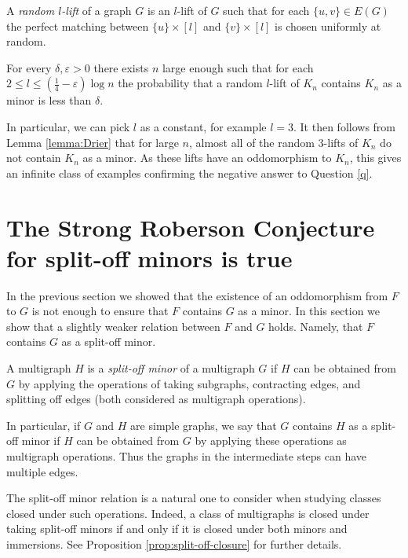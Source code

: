 \documentclass[11pt]{article}
\begin{document}
A \emph{random $l$-lift} of a graph $G$ is an $l$-lift of $G$ such that for each $\{u,v\} \in E(G)$ the perfect matching between $\{u\} \times [l]$ and $\{v\} \times [l]$ is chosen uniformly at random.

\begin{lemma}
\label{lemma:Drier}
    For every $\delta,\varepsilon>0$ there exists $n$ large enough such that for each $2\leq l \leq (\frac14 - \varepsilon) \log n$ the probability that a random $l$-lift of $K_n$ contains $K_n$ as a minor is less than $\delta$.
\end{lemma}

In particular, we can pick $l$ as a constant, for example $l =3$. It then follows from Lemma \ref{lemma:Drier} that for large $n$, almost all of the random $3$-lifts of $K_n$ do not contain $K_n$ as a minor. 
As these lifts have an oddomorphism to $K_n$, this gives an infinite class of examples confirming the negative answer to Question \ref{q}.



\section{The Strong Roberson Conjecture for split-off minors is true}
\label{sec:oddo-means-som}
In the previous section we showed that the existence of an oddomorphism from $F$ to $G$ is not enough to ensure that $F$ contains $G$ as a minor. In this section we show that a slightly weaker relation between $F$ and $G$ holds. Namely, that $F$ contains $G$ as a split-off minor.

\begin{definition}
\label{def:split-off-minors}
    A multigraph $H$ is a \emph{split-off minor} of a multigraph $G$ if $H$ can be obtained from $G$ by applying the operations of taking subgraphs, contracting edges, and splitting off edges (both considered as multigraph operations).
\end{definition}

In particular, if $G$ and $H$ are simple graphs, we say that $G$ contains $H$ as a split-off minor if $H$ can be obtained from $G$ by applying these operations as multigraph operations. Thus the graphs in the intermediate steps can have multiple edges.
\par 
The split-off minor relation is a natural one to consider when studying classes closed under such operations. Indeed, a class of multigraphs is closed under taking split-off minors if and only if it is closed under both minors and immersions. See Proposition \ref{prop:split-off-closure} for further details.
\end{document}
